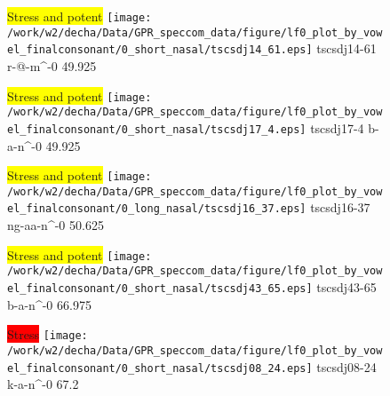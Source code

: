 \documentclass{article}
\begin{document}
\begin{figure}[t]
\begin{minipage}[b]{.24\textwidth}
\colorbox{yellow}{Stress and potent}
\centering
\texttt{[image: /work/w2/decha/Data/GPR\_speccom\_data/figure/lf0\_plot\_by\_vowel\_finalconsonant/0\_short\_nasal/tscsdj14\_61.eps]}
tscsdj14-61 r-@-m\textasciicircum-0 49.925
\end{minipage}
\begin{minipage}[b]{.24\textwidth}
\colorbox{yellow}{Stress and potent}
\centering
\texttt{[image: /work/w2/decha/Data/GPR\_speccom\_data/figure/lf0\_plot\_by\_vowel\_finalconsonant/0\_short\_nasal/tscsdj17\_4.eps]}
tscsdj17-4 b-a-n\textasciicircum-0 49.925
\end{minipage}
\begin{minipage}[b]{.24\textwidth}
\colorbox{yellow}{Stress and potent}
\centering
\texttt{[image: /work/w2/decha/Data/GPR\_speccom\_data/figure/lf0\_plot\_by\_vowel\_finalconsonant/0\_long\_nasal/tscsdj16\_37.eps]}
tscsdj16-37 ng-aa-n\textasciicircum-0 50.625
\end{minipage}
\begin{minipage}[b]{.24\textwidth}
\colorbox{yellow}{Stress and potent}
\centering
\texttt{[image: /work/w2/decha/Data/GPR\_speccom\_data/figure/lf0\_plot\_by\_vowel\_finalconsonant/0\_short\_nasal/tscsdj43\_65.eps]}
tscsdj43-65 b-a-n\textasciicircum-0 66.975
\end{minipage}
\end{figure}

\begin{figure}[t]
\begin{minipage}[b]{.24\textwidth}
\colorbox{red}{Stress}
\centering
\texttt{[image: /work/w2/decha/Data/GPR\_speccom\_data/figure/lf0\_plot\_by\_vowel\_finalconsonant/0\_short\_nasal/tscsdj08\_24.eps]}
tscsdj08-24 k-a-n\textasciicircum-0 67.2
\end{minipage}
\end{figure}
\end{document}

